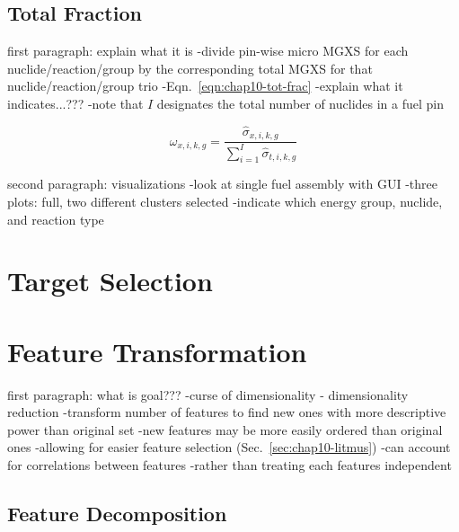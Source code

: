 \clearpage

\subsection{Total Fraction}
\label{subsec:chap10-tot-frac}

first paragraph: explain what it is
-divide pin-wise micro \ac{MGXS} for each nuclide/reaction/group by the corresponding total \ac{MGXS} for that nuclide/reaction/group trio
-Eqn.~\ref{eqn:chap10-tot-frac}
-explain what it indicates...???
-note that $I$ designates the total number of nuclides in a fuel pin

\begin{equation}
\label{eqn:chap10-tot-frac}
\omega_{x,i,k,g} = \frac{\hat{\sigma}_{x,i,k,g}}{\displaystyle\sum\limits_{i=1}^{I}\hat{\sigma}_{t,i,k,g}}
\end{equation}

second paragraph: visualizations
-look at single fuel assembly with GUI
-three plots: full, two different clusters selected
-indicate which energy group, nuclide, and reaction type

\section{Target Selection}
\label{sec:chap10-target-select}

\section{Feature Transformation}
\label{sec:chap10-feature-transform}

first paragraph: what is goal???
-curse of dimensionality - dimensionality reduction
-transform number of features to find new ones with more descriptive power than original set
  -new features may be more easily ordered than original ones
    -allowing for easier feature selection (Sec.~\ref{sec:chap10-litmus})
-can account for correlations between features
  -rather than treating each features independent

\subsection{Feature Decomposition}
\label{subsec:chap10-feature-transform-decomp}

